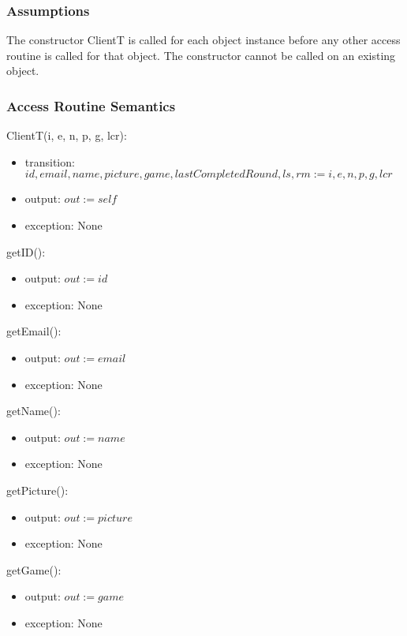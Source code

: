 \documentclass[12pt, titlepage]{article}
\begin{document}
\subsubsection{Assumptions}
The constructor ClientT is called for each object instance before any other access routine is called for that object. The constructor cannot be called on an existing object.

\subsubsection{Access Routine Semantics}

\noindent ClientT(i, e, n, p, g, lcr):
\begin{itemize}
\item transition: $id, email, name, picture, game, lastCompletedRound, ls, rm := i, e, n, p, g, lcr$
\item output: $out := self$
\item exception: None
\end{itemize}

\noindent getID():
\begin{itemize}
\item output: $out := id$
\item exception: None
\end{itemize}

\noindent getEmail():
\begin{itemize}
\item output: $out := email$
\item exception: None
\end{itemize}

\noindent getName():
\begin{itemize}
\item output: $out := name$
\item exception: None
\end{itemize}

\noindent getPicture():
\begin{itemize}
\item output: $out := picture$
\item exception: None
\end{itemize}

\noindent getGame():
\begin{itemize}
\item output: $out := game$
\item exception: None
\end{itemize}
\end{document}
